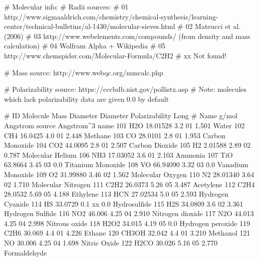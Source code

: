 \documentclass[letterpaper, 12pt]{article}
\begin{document}
\begin{plain}
# Molecular info:
# Radii sources:
# 01  http://www.sigmaaldrich.com/chemistry/chemical-synthesis/learning-center/technical-bulletins/al-1430/molecular-sieves.html
# 02  Mateucci et al. (2006)
# 03  http://www.webelements.com/compounds/ (from density and mass calculation)
# 04  Wolfram Alpha + Wikipedia
# 05  http://www.chemspider.com/Molecular-Formula/C2H2
# xx  Not found!

# Mass source: http://www.webqc.org/mmcalc.php

# Polarizability source: https://cccbdb.nist.gov/pollistx.asp
# Note: molecules which lack polarizability data are given 0.0 by default

# ID    Molecule  Mass         Diameter  Diameter  Polarizability Long
#       Name      g/mol        Angstrom  source    Angstrom^3     name
 101    H2O       18.01528     3.2       01         1.501         Water           
 102    CH4       16.0425      4.0       01         2.448         Methane
 103    CO        28.0101      2.8       01         1.953         Carbon Monoxide
 104    CO2       44.0095      2.8       01         2.507         Carbon Dioxide  
 105    H2         2.01588     2.89      02         0.787         Molecular Helium
 106    NH3       17.03052     3.6       01         2.103         Ammonia
 107    TiO       63.8664      3.45      03         0.0           Titanium Monoxide
 108    VO        66.94090     3.32      03         0.0           Vanadium Monoxide
 109    O2        31.99880     3.46      02         1.562         Molecular Oxygen
 110    N2        28.01340     3.64      02         1.710         Molecular Nitrogen
 111    C2H2      26.0373      5.26      05         3.487         Acetylene
 112    C2H4      28.0532      5.69      05         4.188         Ethylene
 113    HCN       27.02534     5.0       05         2.593         Hydrogen Cyanide
 114    HS        33.0729      0.1       xx         0.0           Hydrosulfide
 115    H2S       34.0809      3.6       02         3.361         Hydrogen Sulfide
 116    NO2       46.006       4.25      04         2.910         Nitrogen dioxide
 117    N2O       44.013       4.25      04         2.998         Nitrous oxide
 118    H2O2      34.015       4.19      05         0.0           Hydrogen peroxide
 119    C2H6      30.069       4.4       01         4.226         Ethane
 120    CH3OH     32.042       4.4       01         3.210         Methanol
 121    NO        30.006       4.25      04         1.698         Nitric Oxide
 122    H2CO      30.026       5.16      05         2.770         Formaldehyde

\end{plain}
\end{document}
